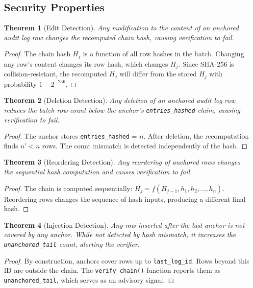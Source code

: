 \documentclass[sigconf,nonacm]{acmart}
\newtheorem{theorem}{Theorem}
\begin{document}
\subsection{Security Properties}

\begin{theorem}[Edit Detection]
Any modification to the content of an anchored audit log row changes the recomputed chain hash, causing verification to fail.
\end{theorem}
\begin{proof}
The chain hash $H_j$ is a function of all row hashes in the batch. Changing any row's content changes its row hash, which changes $H_j$. Since SHA-256 is collision-resistant, the recomputed $H_j$ will differ from the stored $H_j$ with probability $1 - 2^{-256}$.
\end{proof}

\begin{theorem}[Deletion Detection]
Any deletion of an anchored audit log row reduces the batch row count below the anchor's \texttt{entries\_hashed} claim, causing verification to fail.
\end{theorem}
\begin{proof}
The anchor stores \texttt{entries\_hashed} = $n$. After deletion, the recomputation finds $n' < n$ rows. The count mismatch is detected independently of the hash.
\end{proof}

\begin{theorem}[Reordering Detection]
Any reordering of anchored rows changes the sequential hash computation and causes verification to fail.
\end{theorem}
\begin{proof}
The chain is computed sequentially: $H_j = f(H_{j-1}, h_1, h_2, \ldots, h_n)$. Reordering rows changes the sequence of hash inputs, producing a different final hash.
\end{proof}

\begin{theorem}[Injection Detection]
Any row inserted after the last anchor is not covered by any anchor. While not detected by hash mismatch, it increases the \texttt{unanchored\_tail} count, alerting the verifier.
\end{theorem}
\begin{proof}
By construction, anchors cover rows up to \texttt{last\_log\_id}. Rows beyond this ID are outside the chain. The \texttt{verify\_chain()} function reports them as \texttt{unanchored\_tail}, which serves as an advisory signal.
\end{proof}
\end{document}
